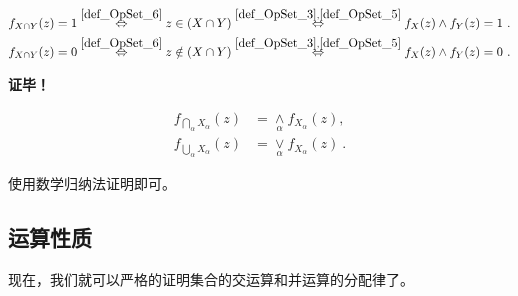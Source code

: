 \begin{equation}
\begin{aligned}
&f_{X\cap Y}(z)=1\overset{\autoref{def_OpSet_6} }{\Leftrightarrow} z\in (X\cap  Y)\overset{\autoref{def_OpSet_3} ,\autoref{def_OpSet_5} }{\Leftrightarrow}f_X(z)\land f_Y(z)=1~.\\
&f_{X\cap Y}(z)=0\overset{\autoref{def_OpSet_6} }{\Leftrightarrow} z\notin (X\cap  Y)\overset{\autoref{def_OpSet_3} ,\autoref{def_OpSet_5} }{\Leftrightarrow}f_X(z)\land f_Y(z)=0~.\\
\end{aligned}
\end{equation}

\textbf{证毕！}

\begin{corollary}{}\label{cor_OpSet_1}
\begin{equation}
\begin{aligned}
    f_{\bigcap_\alpha X_\alpha}(z)&=\underset{\alpha}{\land} f_{X_\alpha}(z),\\
f_{\bigcup_\alpha X_\alpha}(z)&=\underset{\alpha}{\lor} f_{X_\alpha}(z)~.
\end{aligned}
\end{equation}
\end{corollary}
使用数学归纳法证明即可。
\subsection{运算性质}
现在，我们就可以严格的证明集合的交运算和并运算的分配律了。

